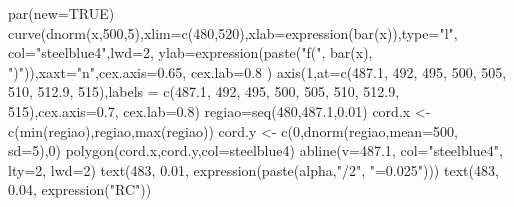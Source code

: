 \documentclass[
  letterpaper,
  DIV=11,
  numbers=noendperiod]{scrartcl}
\newenvironment{Shaded}{\begin{snugshade}}{\end{snugshade}}
\newcommand{\AttributeTok}[1]{\textcolor[rgb]{0.40,0.45,0.13}{#1}}
\newcommand{\ConstantTok}[1]{\textcolor[rgb]{0.56,0.35,0.01}{#1}}
\newcommand{\DecValTok}[1]{\textcolor[rgb]{0.68,0.00,0.00}{#1}}
\newcommand{\FloatTok}[1]{\textcolor[rgb]{0.68,0.00,0.00}{#1}}
\newcommand{\FunctionTok}[1]{\textcolor[rgb]{0.28,0.35,0.67}{#1}}
\newcommand{\NormalTok}[1]{\textcolor[rgb]{0.00,0.23,0.31}{#1}}
\newcommand{\OtherTok}[1]{\textcolor[rgb]{0.00,0.23,0.31}{#1}}
\newcommand{\StringTok}[1]{\textcolor[rgb]{0.13,0.47,0.30}{#1}}
\begin{document}
\begin{Shaded}
\begin{Highlighting}[]
\FunctionTok{par}\NormalTok{(}\AttributeTok{new=}\ConstantTok{TRUE}\NormalTok{)}
\FunctionTok{curve}\NormalTok{(}\FunctionTok{dnorm}\NormalTok{(x,}\DecValTok{500}\NormalTok{,}\DecValTok{5}\NormalTok{),}\AttributeTok{xlim=}\FunctionTok{c}\NormalTok{(}\DecValTok{480}\NormalTok{,}\DecValTok{520}\NormalTok{),}\AttributeTok{xlab=}\FunctionTok{expression}\NormalTok{(}\FunctionTok{bar}\NormalTok{(x)),}\AttributeTok{type=}\StringTok{"l"}\NormalTok{,}
      \AttributeTok{col=}\StringTok{"steelblue4"}\NormalTok{,}\AttributeTok{lwd=}\DecValTok{2}\NormalTok{, }\AttributeTok{ylab=}\FunctionTok{expression}\NormalTok{(}\FunctionTok{paste}\NormalTok{(}\StringTok{"f("}\NormalTok{, }\FunctionTok{bar}\NormalTok{(x),}
      \StringTok{")"}\NormalTok{)),}\AttributeTok{xaxt=}\StringTok{"n"}\NormalTok{,}\AttributeTok{cex.axis=}\FloatTok{0.65}\NormalTok{, }\AttributeTok{cex.lab=}\FloatTok{0.8}\NormalTok{ ) }
\FunctionTok{axis}\NormalTok{(}\DecValTok{1}\NormalTok{,}\AttributeTok{at=}\FunctionTok{c}\NormalTok{(}\FloatTok{487.1}\NormalTok{, }\DecValTok{492}\NormalTok{, }\DecValTok{495}\NormalTok{, }\DecValTok{500}\NormalTok{, }\DecValTok{505}\NormalTok{, }\DecValTok{510}\NormalTok{, }\FloatTok{512.9}\NormalTok{, }\DecValTok{515}\NormalTok{),}\AttributeTok{labels =}
       \FunctionTok{c}\NormalTok{(}\FloatTok{487.1}\NormalTok{, }\DecValTok{492}\NormalTok{, }\DecValTok{495}\NormalTok{, }\DecValTok{500}\NormalTok{, }\DecValTok{505}\NormalTok{, }\DecValTok{510}\NormalTok{, }\FloatTok{512.9}\NormalTok{, }\DecValTok{515}\NormalTok{),}\AttributeTok{cex.axis=}\FloatTok{0.7}\NormalTok{, }\AttributeTok{cex.lab=}\FloatTok{0.8}\NormalTok{) }
\NormalTok{regiao}\OtherTok{=}\FunctionTok{seq}\NormalTok{(}\DecValTok{480}\NormalTok{,}\FloatTok{487.1}\NormalTok{,}\FloatTok{0.01}\NormalTok{)}
\NormalTok{cord.x }\OtherTok{\textless{}{-}} \FunctionTok{c}\NormalTok{(}\FunctionTok{min}\NormalTok{(regiao),regiao,}\FunctionTok{max}\NormalTok{(regiao))}
\NormalTok{cord.y }\OtherTok{\textless{}{-}} \FunctionTok{c}\NormalTok{(}\DecValTok{0}\NormalTok{,}\FunctionTok{dnorm}\NormalTok{(regiao,}\AttributeTok{mean=}\DecValTok{500}\NormalTok{, }\AttributeTok{sd=}\DecValTok{5}\NormalTok{),}\DecValTok{0}\NormalTok{)}
\FunctionTok{polygon}\NormalTok{(cord.x,cord.y,}\AttributeTok{col=}\StringTok{\textquotesingle{}steelblue4\textquotesingle{}}\NormalTok{)}
\FunctionTok{abline}\NormalTok{(}\AttributeTok{v=}\FloatTok{487.1}\NormalTok{, }\AttributeTok{col=}\StringTok{"steelblue4"}\NormalTok{, }\AttributeTok{lty=}\DecValTok{2}\NormalTok{, }\AttributeTok{lwd=}\DecValTok{2}\NormalTok{)}
\FunctionTok{text}\NormalTok{(}\DecValTok{483}\NormalTok{, }\FloatTok{0.01}\NormalTok{, }\FunctionTok{expression}\NormalTok{(}\FunctionTok{paste}\NormalTok{(alpha,}\StringTok{"/2"}\NormalTok{, }\StringTok{"=0.025"}\NormalTok{)))}
\FunctionTok{text}\NormalTok{(}\DecValTok{483}\NormalTok{, }\FloatTok{0.04}\NormalTok{, }\FunctionTok{expression}\NormalTok{(}\StringTok{"RC"}\NormalTok{))}
\end{Highlighting}
\end{Shaded}
\end{document}
